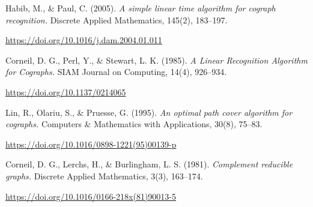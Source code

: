 
\begin{thebibliography}{99}

     Habib, M., \& Paul, C. (2005).
    \textit{A simple linear time algorithm for cograph recognition.}
    Discrete Applied Mathematics, 145(2), 183–197.

    \url{https://doi.org/10.1016/j.dam.2004.01.011}

     Corneil, D. G., Perl, Y., \& Stewart, L. K. (1985).
    \textit{A Linear Recognition Algorithm for Cographs.}
    SIAM Journal on Computing, 14(4), 926–934.

    \url{https://doi.org/10.1137/0214065}

     Lin, R., Olariu, S., \& Pruesse, G. (1995).
    \textit{An optimal path cover algorithm for cographs.}
    Computers \& Mathematics with Applications, 30(8), 75–83.

    \url{https://doi.org/10.1016/0898-1221(95)00139-p}

     Corneil, D. G., Lerchs, H., \& Burlingham, L. S. (1981).
    \textit{Complement reducible graphs.}
    Discrete Applied Mathematics, 3(3), 163–174.

    \url{https://doi.org/10.1016/0166-218x(81)90013-5}

\end{thebibliography}
